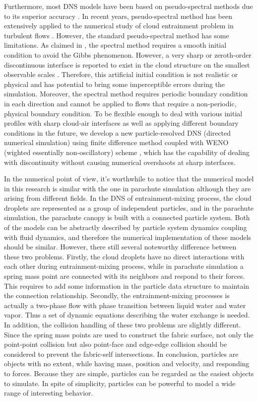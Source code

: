 Furthermore, most DNS models have been based on pseudo-spectral methods due to
its superior accuracy \cite{Rogallo81,Orszag72}. In recent years,
pseudo-spectral method has been extensively applied to the numerical study of
cloud entrainment problem in turbulent flows \cite{And04,Celani05,Kumar11}.
However, the standard pseudo-spectral method has some limitations. As claimed
in \cite{Kumar11}, the spectral method requires a smooth initial condition to
avoid the Gibbs phenomenon. However, a very sharp or zeroth-order discontinuous
interface is reported to exist in the cloud structure on the smallest
observable scales \cite{Brenguier1993}. Therefore, this artificial initial
condition is not realistic or physical and has potential to bring some
imperceptible errors during the simulation. Moreover, the spectral method
requires periodic boundary condition in each direction and cannot be applied to
flows that require a non-periodic, physical boundary condition. To be flexible
enough to deal with various initial profiles with sharp cloud-air interfaces as
well as applying different boundary conditions in the future, we develop a new
particle-resolved DNS (directed numerical simulation) 
using finite difference method coupled with WENO (wighted essentially non-oscillatory) 
scheme \cite{WENO96}, which has the capability of
dealing with discontinuity without causing numerical overshoots at sharp
interfaces.

In the numerical point of view, it's worthwhile to notice that 
the numerical model in this research is similar with the one in parachute simulation 
although they are arising from different fields. 
In the DNS of entrainment-mixing process, the cloud droplets are represented as a group of independent particles, and in the parachute simulation, the parachute canopy is built with a connected particle system. Both of the models can be abstractly described by particle system 
dynamics coupling with fluid dynamics, and therefore the numerical implementation of these 
models should be similar. However, there still several noteworthy difference between these two problems. Firstly, the cloud droplets have no direct interactions with 
each other during entrainment-mixing process, while in parachute simulation a spring mass point are connected with its neighbors and respond to their forces. This requires to add some information in the particle data structure to maintain the connection relationship. Secondly, the entrainment-mixing processes is actually a two-phase flow with phase transition between liquid water and water vapor. Thus a set of dynamic equations describing the water exchange is needed. In addition, the collision handling of these two problems are slightly different. Since the spring mass points are used to construct the fabric surface, 
not only the point-point collision but also point-face and edge-edge collision should be considered to prevent the fabric-self intersections. In conclusion, particles are objects with no extent, while having mass, position and velocity, and responding to forces. Because they are simple, particles can be regarded as the easiest objects to simulate. In spite of simplicity, particles can be powerful to model a wide range of interesting behavior.